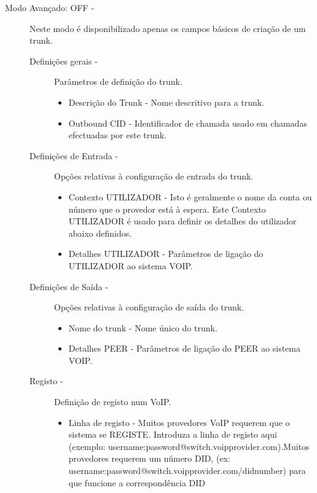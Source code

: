 \begin{description}
	\item[Modo Avançado: OFF -] Neste modo é disponibilizado apenas os campos básicos de criação de um trunk.
        \begin{description}
            \item[Definições gerais -] Parâmetros de definição do trunk.
                \begin{itemize}
                    \item Descrição do Trunk - Nome descritivo para a trunk.
                    \item Outbound CID - Identificador de chamada usado em chamadas efectuadas por este trunk.
                \end{itemize}

            \item[Definições de Entrada -] Opções relativas à configuração de entrada do trunk.
                \begin{itemize}
                    \item Contexto UTILIZADOR - Isto é geralmente o nome da conta ou número que o provedor está à espera. Este Contexto UTILIZADOR é usado para definir os detalhes do utilizador abaixo definidos.
                    \item Detalhes UTILIZADOR - Parâmetros de ligação do UTILIZADOR ao sistema VOIP.                        
                \end{itemize}
            \item[Definições de Saída -] Opções relativas à configuração de saída do trunk.
                \begin{itemize}
                    \item Nome do trunk - Nome único do trunk.
                    \item Detalhes PEER - Parâmetros de ligação do PEER ao sistema VOIP.
                \end{itemize}
            \item[Registo -] Definição de registo num VoIP.
                \begin{itemize}
                    \item Linha de registo - Muitos provedores VoIP requerem que o sistema se REGISTE. Introduza a linha de registo aqui (exemplo: username:password@switch.voipprovider.com).Muitos provedores requerem um número DID, (ex: username:password@switch.voipprovider.com/didnumber) para que funcione a correspondência DID
                \end{itemize}

\end{description}
\end{description}
